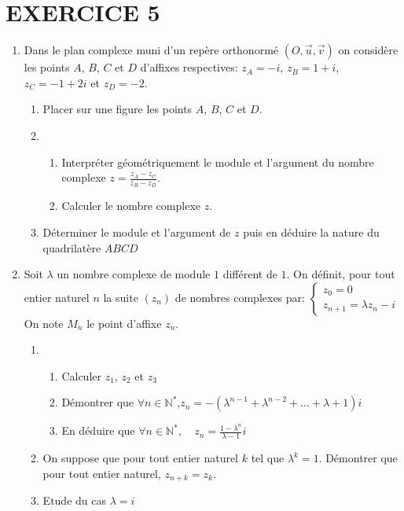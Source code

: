 \documentclass[12pts]{book}
\begin{document}
	\section*{EXERCICE 5}
	\begin{enumerate}
		\item Dans le plan complexe muni d'un repère orthonormé $(O,\overrightarrow{u},\overrightarrow{v})$ on considère les points $A$, $B$, $C$ et $D$ d'affixes respectives: $z_A=-i$, $z_B=1+i$, $z_C=-1+2i$ et $z_D=-2$.
			\begin{enumerate}
				\item Placer sur une figure les points $A$, $B$, $C$ et $D$.
				\item \begin{enumerate}
						\item Interpréter géométriquement le module et l'argument du nombre complexe $z=\frac{z_A-z_C}{z_B-z_D}$.
						\item Calculer le nombre complexe $z$.
				   	  \end{enumerate}
				\item Déterminer le module et l'argument de $z$ puis en déduire la nature du quadrilatère $ABCD$
			\end{enumerate}
		\item Soit $\lambda$ un nombre complexe de module $1$ différent de $1$. On définit, pour tout entier naturel $n$ la suite $(z_n)$ de nombres complexes par: $\left\{\begin{array}{l}
																		z_0=0\\
																		z_{n+1}=\lambda z_n-i
																	\end{array}   \right.$
		On note $M_n$ le point d'affixe $z_n$.
			\begin{enumerate}
				\item \begin{enumerate}
						\item Calculer $z_1$, $z_2$ et $z_3$
						\item Démontrer que $\forall n \in \mathbb{N}^*$,\quad $z_n=-(\lambda^{n-1}+\lambda^{n-2}+ \dots +\lambda+1)i$
						\item En déduire que $\forall n \in \mathbb{N}^*, \quad z_n=\frac{1-\lambda^n}{\lambda-1}i$
					\end{enumerate}
				\item On suppose que pour tout entier naturel $k$ tel que $\lambda^k=1$. Démontrer que pour tout entier naturel, $z_{n+k}=z_k$.
				\item Etude du cas $\lambda=i$

\end{enumerate}
\end{enumerate}
\end{document}
